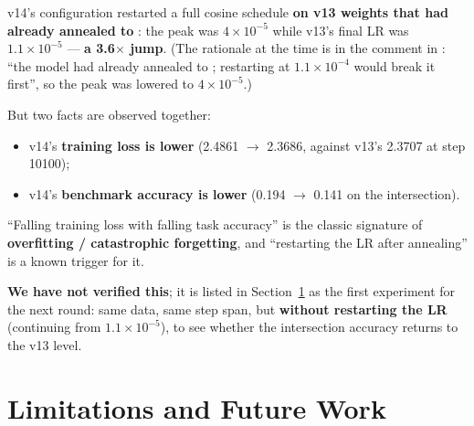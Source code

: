v14's configuration restarted a full cosine schedule \textbf{on v13 weights that had already
annealed to }: the peak was $4\times10^{-5}$ while v13's final LR was
$1.1\times10^{-5}$ --- \textbf{a 3.6$\times$ jump}. (The rationale at the time is in the
comment in : ``the model had already annealed to
; restarting at $1.1\times10^{-4}$ would break it first'', so the peak was
lowered to $4\times10^{-5}$.)

But two facts are observed together:

\begin{itemize}
\item v14's \textbf{training loss is lower} (2.4861 $\rightarrow$ 2.3686, against v13's 2.3707
      at step 10100);
\item v14's \textbf{benchmark accuracy is lower} (0.194 $\rightarrow$ 0.141 on the
      intersection).
\end{itemize}

``Falling training loss with falling task accuracy'' is the classic signature of
\textbf{overfitting / catastrophic forgetting}, and ``restarting the LR after annealing'' is a
known trigger for it.

\textbf{We have not verified this}; it is listed in Section~\ref{sec:en-limits} as the first
experiment for the next round: same data, same step span, but \textbf{without restarting the
LR} (continuing from $1.1\times10^{-5}$), to see whether the intersection accuracy returns to
the v13 level.

\section{Limitations and Future Work}
\label{sec:en-limits}

